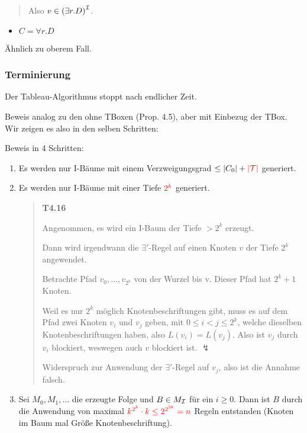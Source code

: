 \begin{quote}
Also $v \in \left( \exists r.D \right)^{\mathcal{I}}$.
\end{quote}

\begin{itemize}
\item
  $C = \forall r.D$
\end{itemize}

Ähnlich zu oberem Fall.

\subsubsection{Terminierung}\label{terminierung}

\begin{proposition}
Der Tableau-Algorithmus stoppt nach endlicher Zeit.
\end{proposition}

Beweis analog zu den ohne TBoxen (Prop. 4.5), aber mit Einbezug der TBox. Wir zeigen es also in den selben Schritten:

Beweis in 4 Schritten:

\begin{enumerate}
\def\labelenumi{\arabic{enumi}.}
\item
  Es werden nur I-Bäume mit einem Verzweigungsgrad $\leq \left| C_{0} \right| + \color{red} \left| \mathcal{T} \right|$ generiert.
\item
  Es werden nur I-Bäume mit einer Tiefe $\color{red} 2^k$ generiert.
  \begin{quote}
  \textbf{T4.16}

  Angenommen, es wird ein I-Baum der Tiefe $> 2^k$ erzeugt.

  Dann wird irgendwann die $\exists '$-Regel auf einen Knoten $v$ der Tiefe $2^k$ angewendet.

  Betrachte Pfad $v_0, \ldots , v_{2^k}$ von der Wurzel bis v. Dieser Pfad hat $2^k+1$ Knoten.

  Weil es nur $2^k$ möglich Knotenbeschriftungen gibt, muss es auf dem Pfad zwei Knoten $v_i$ und $v_j$ geben, mit $0 \leq i < j \leq 2^k$, welche dieselben Knotenbeschriftungen haben, also $L(v_i) = L(v_j)$. Also ist $v_j$ durch $v_i$ blockiert, weswegen auch $v$ blockiert ist. $\lightning$

  Widerspruch zur Anwendung der $\exists '$-Regel auf $v_j$, also ist die Annahme falsch.
  \end{quote}
\item
  Sei $M_{0},M_{1},\ldots$ die erzeugte Folge und $B \in M_{\mathcal{I}}$ für
  ein $i \geq 0$. Dann ist $B$ durch die Anwendung von maximal
  $\color{red} k^{2^{k}} \cdot k \leq 2^{2^{3k}}= n$ Regeln entstanden (Knoten im Baum mal Größe Knotenbeschriftung).
\end{enumerate}

